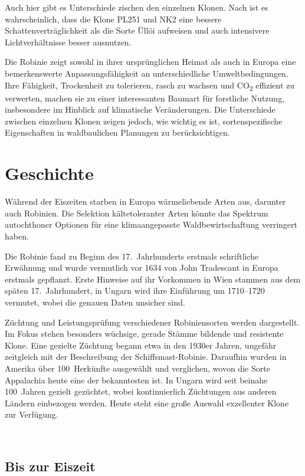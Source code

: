 \documentclass[twocolumn]{scrartcl}
\makeatletter
\newcommand{\summary}[1]{%
  \par %
  {\small\sffamily
    \noindent #1\par}
  \vspace{-0.4em}
  \noindent\makebox[\linewidth]{\rule{0.33\linewidth}{0.4pt}}\\[-1.2em]
  \@afterindentfalse\@afterheading
}
\makeatother
\begin{document}
Auch hier gibt es Unterschiede zischen den einzelnen Klonen. Nach \citet{abri2024lightResponse,abri2024lightResponseB} ist es wahrscheinlich, dass die Klone PL251 und NK2 eine bessere Schattenverträglichkeit als die Sorte Üllöi aufweisen und auch intensivere Lichtverhältnisse besser ausnutzen.

Die Robinie zeigt sowohl in ihrer ursprünglichen Heimat als auch in Europa eine bemerkenswerte Anpassungsfähigkeit an unterschiedliche Umweltbedingungen. Ihre Fähigkeit, Trockenheit zu tolerieren, rasch zu wachsen und CO\textsubscript{2} effizient zu verwerten, machen sie zu einer interessanten Baumart für forstliche Nutzung, insbesondere im Hinblick auf klimatische Veränderungen. Die Unterschiede zwischen einzelnen Klonen zeigen jedoch, wie wichtig es ist, sortenspezifische Eigenschaften in waldbaulichen Planungen zu berücksichtigen.


\section{Geschichte}

\summary{Während der Eiszeiten starben in Europa wärmeliebende Arten
  aus, darunter auch Robinien. Die Selektion kältetoleranter Arten
  könnte das Spektrum autochthoner Optionen für eine klimaangepasste
  Waldbewirtschaftung verringert haben.

  Die Robinie fand zu Beginn des 17.~Jahrhunderts erstmals
  schriftliche Erwähnung und wurde vermutlich vor 1634 von John
  Tradescant in Europa erstmals gepflanzt. Erste Hinweise auf ihr
  Vorkommen in Wien stammen aus dem späten 17.~Jahrhundert, in Ungarn
  wird ihre Einführung um 1710–1720 vermutet, wobei die genauen Daten
  unsicher sind.

  Züchtung und Leistungsprüfung verschiedener Robiniensorten werden
  dargestellt. Im Fokus stehen besonders wüchsige, gerade Stämme
  bildende und resistente Klone. Eine gezielte Züchtung begann etwa in
  den 1930er Jahren, ungefähr zeitgleich mit der Beschreibung der
  Schiffsmast-Robinie. Daraufhin wurden in Amerika über 100~Herkünfte
  ausgewählt und verglichen, wovon die Sorte Appalachia heute eine der
  bekanntesten ist. In Ungarn wird seit beinahe 100~Jahren gezielt
  gezüchtet, wobei kontinuierlich Züchtungen aus anderen Ländern
  einbezogen werden. Heute steht eine große Auswahl exzellenter Klone
  zur Verfügung.}

\subsection{Bis zur Eiszeit}
\end{document}
